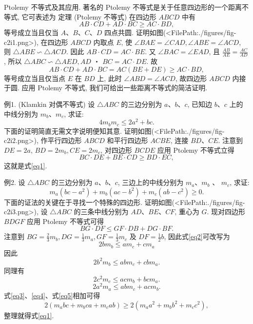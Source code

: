
Ptolemy 不等式及其应用.
著名的 Ptolemy 不等式是关于任意四边形的一个距离不等式, 它可表述为
定理 (Ptolemy 不等式) 在四边形 $A B C D$ 中有
$$
A B \cdot C D+A D \cdot B C \geqslant A C \cdot B D,
$$
等号成立当且仅当 $A 、 B 、 C 、 D$ 四点共圆.
证明如图(<FilePath:./figures/fig-c2i1.png>), 在四边形 $A B C D$ 内取点 $E$, 使 $\angle B A E=\angle C A D, \angle A B E=\angle A C D$, 则 $\triangle A B E \backsim \triangle A C D$. 因此 $A B \cdot C D=A C \cdot B E$. 又 $\angle B A C= \angle E A D$, 且 $\frac{A B}{A E}=\frac{A C}{A D}$, 所以 $\triangle A B C \backsim \triangle A E D, A D$ ・ $B C=A C \cdot D E$. 故
$$
A B \cdot C D+A D \cdot B C=A C(B E+D E) \geqslant A C \cdot B D,
$$
等号成立当且仅当点 $E$ 在 $B D$ 上, 此时 $\angle A B D=\angle A C D$, 故四边形 $A B C D$ 内接于圆.
应用 Ptolemy 不等式, 我们可给出一些距离不等式的简洁证明.



例1. (Klamkin 对偶不等式) 设 $\triangle A B C$ 的三边分别为 $a 、 b 、 c$, 已知边 $b 、 c$ 上的中线分别为 $m_b 、 m_c$, 求证:
$$
4 m_b m_c \leqslant 2 a^2+b c . \label{eq1}
$$
下面的证明简直无需文字说明便知其意.
证明如图(<FilePath:./figures/fig-c2i2.png>), 作平行四边形 $A B C D$ 和平行四边形 $A C B E$, 连接 $B D 、 C E$. 注意到 $D E=2 a$, $B D=2 m_b, C E=2 m_c$, 对四边形 $B C D E$ 应用 Ptolemy 不等式立得
$$
B C \cdot D E+B E \cdot C D \geqslant B D \cdot E C,
$$
这就是式\ref{eq1}.



例2. 设 $\triangle A B C$ 的三边分别为 $a 、 b 、 c$, 三边上的中线分别为 $m_a 、 m_b$ 、 $m_c$, 求证:
$$
m_a\left(b c-a^2\right)+m_b\left(a c-b^2\right)+m_c\left(a b-c^2\right) \geqslant 0 . \label{eq1}
$$
下面的证法的关键在于寻找一个特殊的四边形.
证明如图(<FilePath:./figures/fig-c2i3.png>), 设 $\triangle A B C$ 的三条中线分别为 $A D 、 B E 、 C F$, 重心为 $G$.
现对四边形 $B D G F$ 应用 Ptolemy 不等式可得
$$
B G \cdot D F \leqslant G F \cdot D B+D G \cdot B F . \label{eq2}
$$
注意到 $B G=\frac{2}{3} m_b, D G=\frac{1}{3} m_a, G F=\frac{1}{3} m_c$ 及 $D F=\frac{1}{2} b$, 因此式\ref{eq2}可改写为
$$
2 b m_b \leqslant a m_c+c m_a 
$$
因此
$$
2 b^2 m_b \leqslant a b m_c+c b m_a. \label{eq3}
$$
同理有
$$
2 c^2 m_c \leqslant a c m_b+b c m_a. \label{eq4}
$$
$$
2 a^2 m_a \leqslant a b m_c+a c m_b . \label{eq5}
$$
式\ref{eq3}、\ref{eq4}、式\ref{eq5}相加可得
$$
2\left(m_a b c+m_b c a+m_c a b\right) \geqslant 2\left(m_a a^2+m_b b^2+m_c c^2\right),
$$
整理就得式\ref{eq1}.



